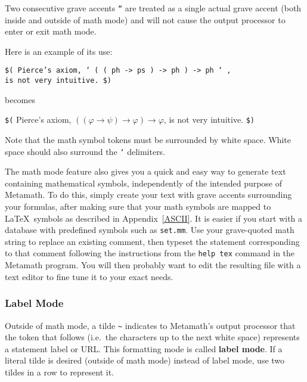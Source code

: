 Two consecutive
grave accents \texttt{``} are treated as a single actual grave accent
(both inside and outside of math mode) and will not cause the output
processor to enter or exit math mode.

Here is an example of its use:
\begin{center}
\texttt{\$( Pierce's axiom, ` ( ( ph -> ps ) -> ph ) -> ph ` ,\\
         is not very intuitive. \$)}
\end{center}
becomes
\begin{center}
   \texttt{\$(} Pierce's axiom, $((\varphi \rightarrow \psi)\rightarrow
\varphi)\rightarrow \varphi$, is not very intuitive. \texttt{\$)}
\end{center}

Note that the math symbol tokens must be surrounded by white
space.
White space should also surround the \texttt{`}
delimiters.

The math mode feature also gives you a quick and easy way to generate
text containing mathematical symbols, independently of the intended
purpose of Metamath. To do this,
simply create your text with grave accents surrounding your formulas,
after making sure that your math symbols are mapped to \LaTeX\ symbols
as described in Appendix~\ref{ASCII}.  It is easier if you start with a
database with predefined symbols such as \texttt{set.mm}.  Use your
grave-quoted math string to replace an existing comment, then typeset
the statement corresponding to that comment following the instructions
from the \texttt{help tex} command in the Metamath program.  You will
then probably want to edit the resulting file with a text editor to fine
tune it to your exact needs.

\subsubsection{Label Mode}

Outside of math mode, a tilde \verb/~/
indicates to Metamath's output processor that the
token that follows (i.e.\ the characters up to the next
white space) represents a statement label or URL.
This formatting mode is called {\bf label mode}.
If a literal tilde
is desired (outside of math mode) instead of label mode,
use two tildes in a row to represent it.

